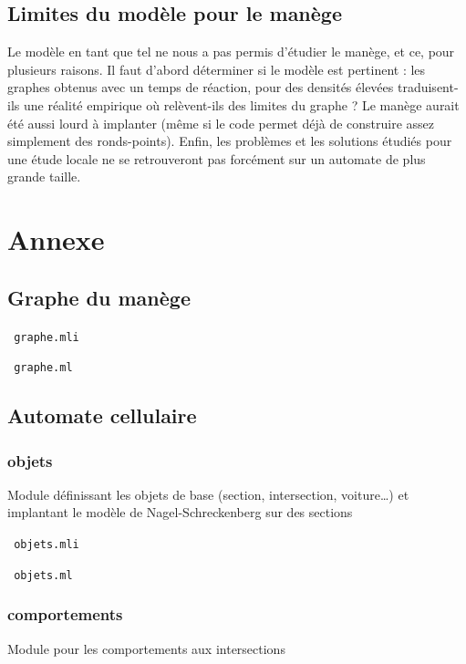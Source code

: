 \documentclass[11pt]{article}
\begin{document}
	 
	\subsection{Limites du modèle pour le manège}
Le modèle en tant que tel ne nous a pas permis d'étudier le manège, et ce, pour plusieurs raisons. Il faut d'abord déterminer si le modèle est pertinent : les graphes obtenus avec un temps de réaction, pour des densités élevées traduisent-ils une réalité empirique où relèvent-ils des limites du graphe ? Le manège aurait été aussi lourd à implanter (même si le code permet déjà de construire assez simplement des ronds-points). Enfin, les problèmes et les solutions étudiés pour une étude locale ne se retrouveront pas forcément sur un automate de plus grande taille.
	
\label{finres}	
	
\renewcommand{\refname}{Bibliographie}




\section{Annexe}

	\subsection{Graphe du manège}

\label{grmli}
\verb+ graphe.mli+


\verb+ graphe.ml+

	\subsection{Automate cellulaire} 
	
			\subsubsection{objets}
Module définissant les objets de base (section, intersection, voiture…) et implantant le modèle de Nagel-Schreckenberg sur des sections

\verb+ objets.mli+


\verb+ objets.ml+

			\subsubsection{comportements}
Module pour les comportements aux intersections
\end{document}
